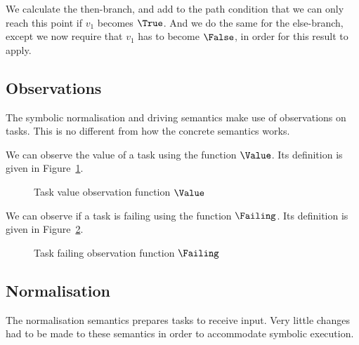 We calculate the then-branch, and add to the path condition that we can only reach this point if $v_1$ becomes $\True$.
And we do the same for the else-branch, except we now require that $v_1$ has to become $\False$, in order for this result to apply.

\subsection{Observations}

The symbolic normalisation and driving semantics make use of observations on tasks.
This is no different from how the concrete \TOPHAT semantics works.

We can observe the value of a task using the function $\Value$.
Its definition is given in Figure~\ref{fig:value}.

\begin{figure}
  \begin{center}
    \small
  \end{center}
  \caption{Task value observation function $\Value$}
  \label{fig:value}
\end{figure}

We can observe if a task is failing using the function $\Failing$.
Its definition is given in Figure~\ref{fig:failing}.

\begin{figure}
  \begin{center}
    \small
  \end{center}
  \caption{Task failing observation function $\Failing$}
  \label{fig:failing}
\end{figure}


\subsection{Normalisation}

The normalisation semantics prepares tasks to receive input.
Very little changes had to be made to these semantics in order to accommodate symbolic execution.

